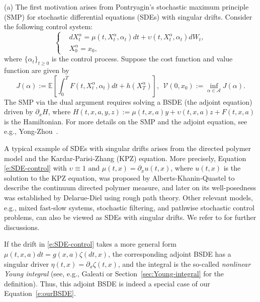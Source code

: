 \documentclass[11pt,reqno]{amsart}
\numberwithin{equation}{section}
\begin{document}
(a) The first motivation arises from Pontryagin's stochastic maximum principle (SMP) for stochastic differential equations (SDEs) with singular  drifts. Consider the following control system:
\begin{equation}\label{e:SDE-control}
\left\{\begin{aligned}
&dX^{\alpha}_{t} = \mu(t,X^{\alpha}_{t},\alpha_{t})dt + \upsilon(t,X^{\alpha}_{t},\alpha_{t})dW_{t}, \\
&X^{\alpha}_{0} = x_{0}, 
\end{aligned}\right.
\end{equation}
where $\{\alpha_t\}_{t\ge 0}$ is the control process. Suppose the cost function and value function are given by 
\[
J(\alpha):=\mathbb{E}\left[\int_{0}^{T}F(t,X^{\alpha}_{t},\alpha_{t})dt + h(X^{\alpha}_{T})\right], \ \ \mathcal{V}(0,x_0):= \inf_{\alpha \in \mathcal{A}} J(\alpha).
\] 
The SMP via the dual argument requires solving a BSDE (the adjoint equation) driven by $\partial_x H$,
where $H(t,x,a,y,z):=\mu(t,x,a)y + \upsilon(t,x,a)z + F(t,x,a)$
is the Hamiltonian. For more details on the SMP and the adjoint equation, see e.g., Yong-Zhou~\cite{Yong1999}. 

A typical example of SDEs with singular drifts arises from the directed polymer model and the Kardar-Parisi-Zhang (KPZ) equation. More precisely, Equation \eqref{e:SDE-control} with $\upsilon\equiv 1$ and $\mu(t,x)=\partial_x u(t,x)$, where $u(t,x)$ is  the solution to the KPZ equation, was proposed by Alberts-Khanin-Quastel \cite{AKQ14} to describe the continuum directed polymer measure, and later on its well-posedness was established by Delarue-Diel \cite{Delarue-Diel16} using rough path theory. Other relevant models, e.g., mixed fast-slow systems, stochastic filtering, and pathwise stochastic control problems, can also be viewed as SDEs with singular drifts. We refer to \cite{pei2021averaging,hairer2022generating,friz2021rough,FLZ24,HZ25} for further discussions.


If the drift in \eqref{e:SDE-control} takes a more general form  
$\mu(t,x,a) dt = g(x, a) \zeta(dt, x)$, the corresponding adjoint BSDE has a singular driver  $\eta(t,x) = \partial_{x}\zeta(t,x)$, and the integral is the
so-called \emph{nonlinear Young integral} (see, e.g., Galeati \cite{galeati2021nonlinear} or Section~\ref{sec:Young-integral} for the definition). Thus, this adjoint BSDE is indeed a special case of our Equation~\eqref{e:ourBSDE}. \\
\end{document}
